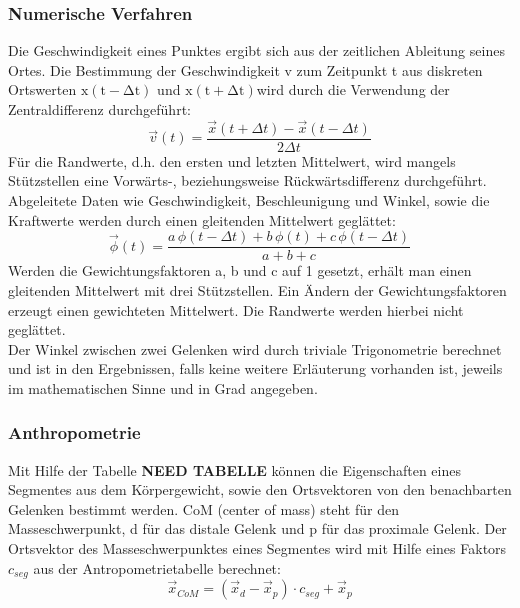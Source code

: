 \subsubsection{Numerische Verfahren}
Die Geschwindigkeit eines Punktes ergibt sich aus der zeitlichen Ableitung seines Ortes. Die Bestimmung der Geschwindigkeit v zum Zeitpunkt t aus diskreten Ortswerten $\mathrm{x(t - \Delta{t})}$ und $\mathrm{x(t + \Delta{t})}$wird durch die Verwendung der Zentraldifferenz durchgeführt:
\begin{equation}
	\vec{v}(t) = \frac{\vec{x}(t + \Delta{t}) - \vec{x}(t - \Delta{t})}{2\Delta{t}}
\end{equation}
Für die Randwerte, d.h. den ersten und letzten Mittelwert, wird mangels Stützstellen eine Vorwärts-, beziehungsweise Rückwärtsdifferenz durchgeführt.
Abgeleitete Daten wie Geschwindigkeit, Beschleunigung und Winkel, sowie die Kraftwerte werden durch einen gleitenden Mittelwert geglättet:
\begin{equation}
	    \vec{\phi}(t) = \frac{a\,\phi(t - \Delta{t}) + b\,\phi(t) + c\,\phi(t - \Delta{t})}{a + b + c}
\end{equation}
Werden die Gewichtungsfaktoren a, b und c auf 1 gesetzt, erhält man einen gleitenden Mittelwert mit drei Stützstellen. Ein Ändern der Gewichtungsfaktoren erzeugt einen gewichteten Mittelwert. Die Randwerte werden hierbei nicht geglättet.\\
Der Winkel zwischen zwei Gelenken wird durch triviale Trigonometrie berechnet und ist in den Ergebnissen, falls keine weitere Erläuterung vorhanden ist, jeweils im mathematischen Sinne und in Grad angegeben. 

\subsubsection{Anthropometrie}
Mit Hilfe der Tabelle \textbf{NEED TABELLE} können die Eigenschaften eines Segmentes aus dem Körpergewicht, sowie den Ortsvektoren von den benachbarten Gelenken bestimmt werden. CoM (center of mass) steht für den Masseschwerpunkt, d für das distale Gelenk und p für das proximale Gelenk. Der Ortsvektor des Masseschwerpunktes eines Segmentes wird mit Hilfe eines Faktors $c_{seg}$ aus der Antropometrietabelle berechnet:
\begin{equation}
\vec{x}_{CoM} = (\vec{x}_d - \vec{x}_p) \cdot c_{seg} + \vec{x}_p
\label{eq:CoM_x}
\end{equation}

